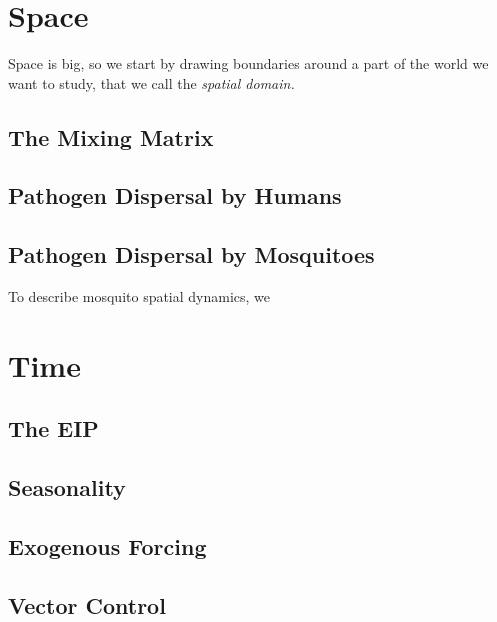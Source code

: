 \documentclass[
]{book}
\begin{document}
\hypertarget{space}{%
\section{Space}\label{space}}

Space is big, so we start by drawing boundaries around a part of the world we want to study, that we call the \emph{spatial domain.}

\hypertarget{the-mixing-matrix}{%
\subsection{The Mixing Matrix}\label{the-mixing-matrix}}

\hypertarget{pathogen-dispersal-by-humans}{%
\subsection{Pathogen Dispersal by Humans}\label{pathogen-dispersal-by-humans}}

\hypertarget{pathogen-dispersal-by-mosquitoes}{%
\subsection{Pathogen Dispersal by Mosquitoes}\label{pathogen-dispersal-by-mosquitoes}}

To describe mosquito spatial dynamics, we

\hypertarget{time}{%
\section{Time}\label{time}}

\hypertarget{the-eip}{%
\subsection{The EIP}\label{the-eip}}

\hypertarget{seasonality}{%
\subsection{Seasonality}\label{seasonality}}

\hypertarget{exogenous-forcing-1}{%
\subsection{Exogenous Forcing}\label{exogenous-forcing-1}}

\hypertarget{vector-control}{%
\subsection{Vector Control}\label{vector-control}}
\end{document}
